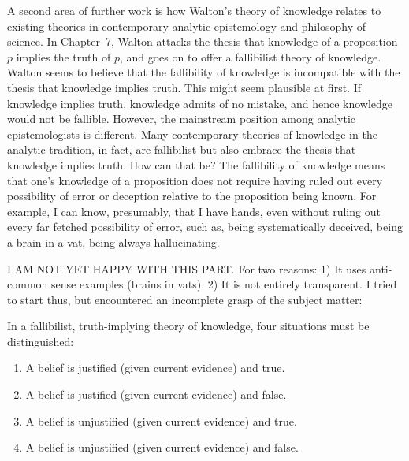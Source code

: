 \documentclass[12pt]{article}
\begin{document}
A second area of further work is how Walton's theory of knowledge relates to existing theories 
in contemporary analytic epistemology and philosophy of science. 
In Chapter~7, Walton attacks the thesis that knowledge of a proposition $p$ implies
the truth  of $p$, and goes on to offer a fallibilist theory of
knowledge. Walton seems to believe that the fallibility of knowledge is incompatible 
with the thesis that knowledge implies truth.  This might seem plausible at first. 
If knowledge implies truth, knowledge admits of no mistake, 
and hence knowledge would not be fallible. However, the mainstream position 
among analytic epistemologists is different. Many contemporary theories of
knowledge in the analytic tradition, in fact, are fallibilist 
but also embrace the thesis that knowledge implies truth. 
How can that be? 
The fallibility of knowledge means that one's knowledge of a proposition 
does not require having ruled out every possibility of error or deception relative to the proposition 
being known. For example, I can know, 
presumably, that I have hands, even without ruling out every far fetched possibility of error, such as, being systematically deceived, being a brain-in-a-vat, being always hallucinating. 

I AM NOT YET HAPPY WITH THIS PART. For two reasons: 1) It uses anti-common sense examples (brains in vats). 2) It is not entirely transparent. I tried to start thus, but encountered an incomplete grasp of the subject matter:

In a fallibilist, truth-implying theory of knowledge, four situations must be distinguished:

\begin{enumerate}
	\item A belief is justified (given current evidence) and true.
	\item A belief is justified (given current evidence) and false.
	\item A belief is unjustified (given current evidence) and true.
	\item A belief is unjustified (given current evidence) and false.
\end{enumerate}
\end{document}
